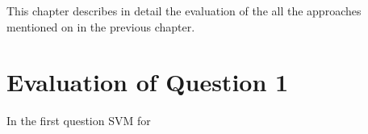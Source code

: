 \label{ch:evaluation}
This chapter describes in detail the evaluation of the all the approaches mentioned on in the previous chapter.

\section{Evaluation of Question 1}
In the first question SVM for 
